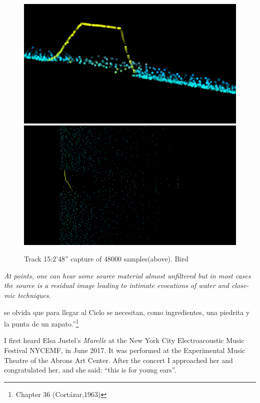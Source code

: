\documentclass{article}
\begin{document}
\begin{figure}
\begin{multicols}{2}
    \includegraphics[width=\linewidth]{preset-31-elsa-7100000.jpg}%
    \includegraphics[width=\linewidth]{preset-56-elsa-7300000.jpg}%
\end{multicols}
\caption{Track 15:2'48'' capture of 48000 samples(above). Bird}
\end{figure}


\bigskip

\textit{
At points, one can hear some source material almost unfiltered but in most cases the source is a residual image leading to intimate evocations of water and close-mic techniques. }


\bigskip

se olvida que para llegar al Cielo se necesitan, como ingredientes, una piedrita y la punta de un zapato.''\footnote{Chapter 36 (Cort\'{a}zar,1963)}


\bigskip
\bigskip
\bigskip

I first heard Elsa Justel's \textit{Marelle} at the New York City Electroacoustic Music Festival NYCEMF, in June 2017. It was performed at the Experimental Music Theatre of the Abrons Art Center. After the concert I approached her and congratulated her, and she said: ``this is for young ears''.


\end{document}
